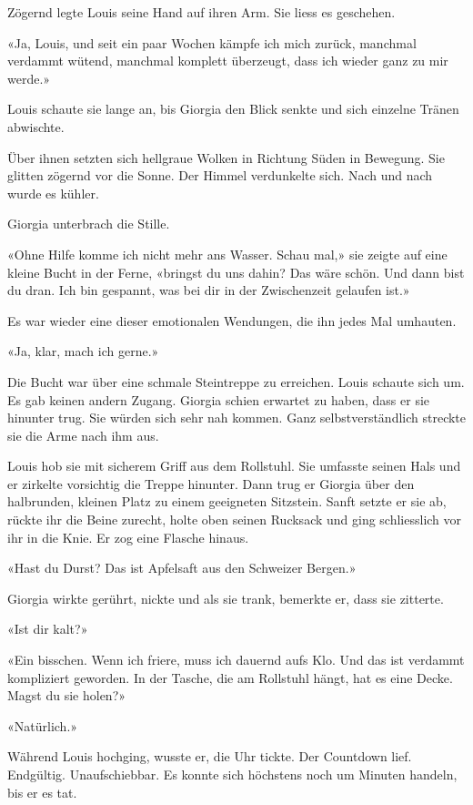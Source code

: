 Zögernd legte Louis seine Hand auf ihren Arm. Sie liess es geschehen.

«Ja, Louis, und seit ein paar Wochen kämpfe ich mich zurück, manchmal
verdammt wütend, manchmal komplett überzeugt, dass ich wieder ganz zu
mir werde.»

Louis schaute sie lange an, bis Giorgia den Blick senkte und sich
einzelne Tränen abwischte.

Über ihnen setzten sich hellgraue Wolken in Richtung Süden in Bewegung.
Sie glitten zögernd vor die Sonne. Der Himmel verdunkelte sich. Nach und
nach wurde es kühler.

Giorgia unterbrach die Stille.

«Ohne Hilfe komme ich nicht mehr ans Wasser. Schau mal,» sie zeigte auf
eine kleine Bucht in der Ferne, «bringst du uns dahin? Das wäre schön.
Und dann bist du dran. Ich bin gespannt, was bei dir in der Zwischenzeit
gelaufen ist.»

Es war wieder eine dieser emotionalen Wendungen, die ihn jedes Mal
umhauten.

«Ja, klar, mach ich gerne.»

Die Bucht war über eine schmale Steintreppe zu erreichen. Louis schaute
sich um. Es gab keinen andern Zugang. Giorgia schien erwartet zu haben,
dass er sie hinunter trug. Sie würden sich sehr nah kommen. Ganz
selbstverständlich streckte sie die Arme nach ihm aus.

Louis hob sie mit sicherem Griff aus dem Rollstuhl. Sie umfasste seinen
Hals und er zirkelte vorsichtig die Treppe hinunter. Dann trug er
Giorgia über den halbrunden, kleinen Platz zu einem geeigneten
Sitzstein. Sanft setzte er sie ab, rückte ihr die Beine zurecht, holte
oben seinen Rucksack und ging schliesslich vor ihr in die Knie. Er zog
eine Flasche hinaus.

«Hast du Durst? Das ist Apfelsaft aus den Schweizer Bergen.»

Giorgia wirkte gerührt, nickte und als sie trank, bemerkte er, dass sie
zitterte.

«Ist dir kalt?»

«Ein bisschen. Wenn ich friere, muss ich dauernd aufs Klo. Und das ist
verdammt kompliziert geworden. In der Tasche, die am Rollstuhl hängt,
hat es eine Decke. Magst du sie holen?»

«Natürlich.»

Während Louis hochging, wusste er, die Uhr tickte. Der Countdown lief.
Endgültig. Unaufschiebbar. Es konnte sich höchstens noch um Minuten
handeln, bis er es tat.

